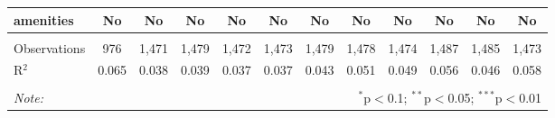 \begin{table}[!htbp]
\begin{tabular}{@{\extracolsep{5pt}}lccccccccccc}
amenities & No & No & No & No & No & No & No & No & No & No & No \\ 
\hline \\[-1.8ex] 
Observations & 976 & 1,471 & 1,479 & 1,472 & 1,473 & 1,479 & 1,478 & 1,474 & 1,487 & 1,485 & 1,473 \\ 
R$^{2}$ & 0.065 & 0.038 & 0.039 & 0.037 & 0.037 & 0.043 & 0.051 & 0.049 & 0.056 & 0.046 & 0.058 \\ 
\hline 
\hline \\[-1.8ex] 
\textit{Note:}  & \multicolumn{11}{r}{$^{*}$p$<$0.1; $^{**}$p$<$0.05; $^{***}$p$<$0.01} \\ 
\end{tabular} 
\end{table} 
